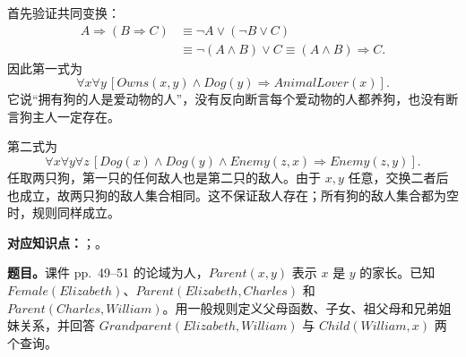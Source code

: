 \begin{workedsolution}
首先验证共同变换：
\begin{align*}
 A\Rightarrow(B\Rightarrow C)
 &\equiv\neg A\lor(\neg B\lor C)\\
 &\equiv\neg(A\land B)\lor C
 \equiv(A\land B)\Rightarrow C.
\end{align*}
因此第一式为
\[
 \forall x\forall y\,
 [Owns(x,y)\land Dog(y)\Rightarrow AnimalLover(x)].
\]
它说“拥有狗的人是爱动物的人”，没有反向断言每个爱动物的人都养狗，也没有断言狗主人一定存在。

第二式为
\[
 \forall x\forall y\forall z\,
 [Dog(x)\land Dog(y)\land Enemy(z,x)\Rightarrow Enemy(z,y)].
\]
任取两只狗，第一只的任何敌人也是第二只的敌人。由于 $x,y$ 任意，交换二者后也成立，故两只狗的敌人集合相同。这不保证敌人存在；所有狗的敌人集合都为空时，规则同样成立。
\end{workedsolution}


\textbf{对应知识点：}；。

\textbf{题目。}课件 pp.~49--51 的论域为人，$Parent(x,y)$ 表示 $x$ 是 $y$ 的家长。已知 $Female(Elizabeth)$、$Parent(Elizabeth,Charles)$ 和 $Parent(Charles,William)$。用一般规则定义父母函数、子女、祖父母和兄弟姐妹关系，并回答 $Grandparent(Elizabeth,William)$ 与 $Child(William,x)$ 两个查询。

